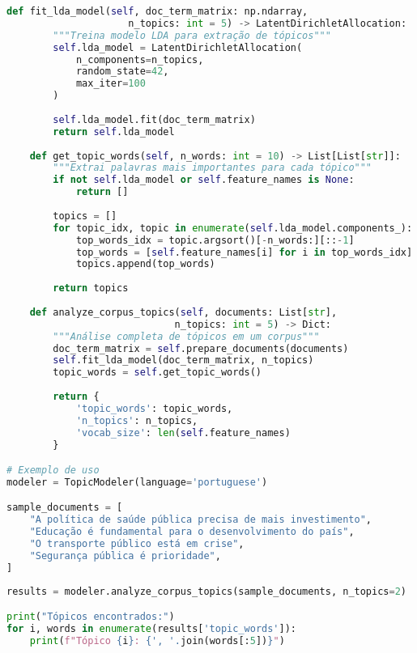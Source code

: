 \begin{pythonbox}
\begin{lstlisting}[language=Python]   
    def fit_lda_model(self, doc_term_matrix: np.ndarray, 
                     n_topics: int = 5) -> LatentDirichletAllocation:
        """Treina modelo LDA para extração de tópicos"""
        self.lda_model = LatentDirichletAllocation(
            n_components=n_topics,
            random_state=42,
            max_iter=100
        )
        
        self.lda_model.fit(doc_term_matrix)
        return self.lda_model
    
    def get_topic_words(self, n_words: int = 10) -> List[List[str]]:
        """Extrai palavras mais importantes para cada tópico"""
        if not self.lda_model or self.feature_names is None:
            return []
            
        topics = []
        for topic_idx, topic in enumerate(self.lda_model.components_):
            top_words_idx = topic.argsort()[-n_words:][::-1]
            top_words = [self.feature_names[i] for i in top_words_idx]
            topics.append(top_words)
            
        return topics
    
    def analyze_corpus_topics(self, documents: List[str], 
                             n_topics: int = 5) -> Dict:
        """Análise completa de tópicos em um corpus"""
        doc_term_matrix = self.prepare_documents(documents)
        self.fit_lda_model(doc_term_matrix, n_topics)
        topic_words = self.get_topic_words()
        
        return {
            'topic_words': topic_words,
            'n_topics': n_topics,
            'vocab_size': len(self.feature_names)
        }

# Exemplo de uso
modeler = TopicModeler(language='portuguese')

sample_documents = [
    "A política de saúde pública precisa de mais investimento",
    "Educação é fundamental para o desenvolvimento do país",
    "O transporte público está em crise",
    "Segurança pública é prioridade",
]
    \end{lstlisting}
\end{pythonbox}
\begin{pythonbox}
\begin{lstlisting}[language=Python]   
results = modeler.analyze_corpus_topics(sample_documents, n_topics=2)

print("Tópicos encontrados:")
for i, words in enumerate(results['topic_words']):
    print(f"Tópico {i}: {', '.join(words[:5])}")
\end{lstlisting}
\end{pythonbox}

